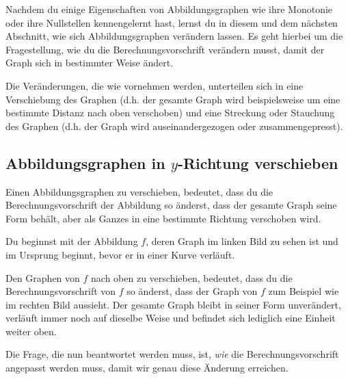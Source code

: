 \documentclass[../../main.tex]{subfiles}
\begin{document}
Nachdem du einige Eigenschaften von Abbildungsgraphen wie ihre Monotonie oder ihre Nullstellen kennengelernt hast, lernst du in diesem und dem nächsten Abschnitt, wie sich Abbildungsgraphen verändern lassen. Es geht hierbei um die Fragestellung, wie du die Berechnungsvorschrift verändern musst, damit der Graph sich in bestimmter Weise ändert.

Die Veränderungen, die wie vornehmen werden, unterteilen sich in eine Verschiebung des Graphen (d.h. der gesamte Graph wird beispielsweise um eine bestimmte Distanz nach oben verschoben) und eine Streckung oder Stauchung des Graphen (d.h. der Graph wird auseinandergezogen oder zusammengepresst).

\subsection{Abbildungsgraphen in $y$-Richtung verschieben}
\label{sec:abbildungen_verschieben_y}

Einen Abbildungsgraphen zu verschieben, bedeutet, dass du die Berechnungsvorschrift der Abbildung so änderst, dass der gesamte Graph seine Form behält, aber als Ganzes in eine bestimmte Richtung verschoben wird.

\begin{example}{}
    Du beginnst mit der Abbildung $f$, deren Graph im linken Bild zu sehen ist und im Ursprung beginnt, bevor er in einer Kurve verläuft.
    
    Den Graphen von $f$ nach oben zu verschieben, bedeutet, dass du die Berechnungsvorschrift von $f$ so änderst, dass der Graph von $f$ zum Beispiel wie im rechten Bild aussieht. Der gesamte Graph bleibt in seiner Form unverändert, verläuft immer noch auf dieselbe Weise und befindet sich lediglich eine Einheit weiter oben.
    \begin{multicols}{2}\centering
        
    \end{multicols}
    
    Die Frage, die nun beantwortet werden muss, ist, \emph{wie} die Berechnungsvorschrift angepasst werden muss, damit wir genau diese Änderung erreichen.
\end{example}
\end{document}
